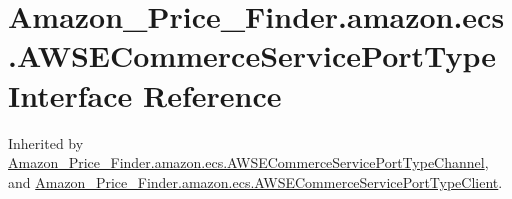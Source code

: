 \hypertarget{interface_amazon___price___finder_1_1amazon_1_1ecs_1_1_a_w_s_e_commerce_service_port_type}{\section{Amazon\-\_\-\-Price\-\_\-\-Finder.\-amazon.\-ecs.\-A\-W\-S\-E\-Commerce\-Service\-Port\-Type Interface Reference}
\label{interface_amazon___price___finder_1_1amazon_1_1ecs_1_1_a_w_s_e_commerce_service_port_type}
}


Inherited by \hyperlink{interface_amazon___price___finder_1_1amazon_1_1ecs_1_1_a_w_s_e_commerce_service_port_type_channel}{Amazon\-\_\-\-Price\-\_\-\-Finder.\-amazon.\-ecs.\-A\-W\-S\-E\-Commerce\-Service\-Port\-Type\-Channel}, and \hyperlink{class_amazon___price___finder_1_1amazon_1_1ecs_1_1_a_w_s_e_commerce_service_port_type_client}{Amazon\-\_\-\-Price\-\_\-\-Finder.\-amazon.\-ecs.\-A\-W\-S\-E\-Commerce\-Service\-Port\-Type\-Client}.


